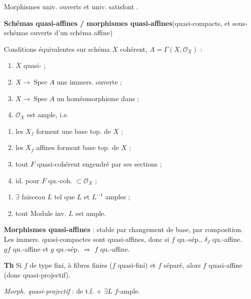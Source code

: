 \documentclass[11pt,a4paper]{article}
\begin{document}
Morphismes univ. ouverts et univ.  satisfont .

\textbf{Schémas quasi-affines / morphismes quasi-affines}\quad (quasi-compacts, et  sous-schémas ouverts d'un schéma affine)

Conditions équivalentes sur schéma $X$ cohérent, $A = \Gamma(X, \mathcal{O}_X)$ :

\begin{enumerate}
  \item[a)] $X$ quasi- ;
  \item[b)] $X \to \operatorname{Spec} A$ une immers. ouverte ;
  \item[b')] $X \to \operatorname{Spec} A$ un homéomorphisme dans ;
  \item[c)] $\mathcal{O}_X$ est ample, i.e.
\end{enumerate}

\begin{enumerate}
    \item[c')] les $X_f$ forment une base top. de $X$ ;
    \item[c'')] les $X_f$ affines forment base top. de $X$ ;
    \item[c''')] tout $F$ quasi-cohérent engendré par ses sections ;
    \item[c'''')] id. pour $F$ qu.-coh. $\subset \mathcal{O}_X$ ;
\end{enumerate}

\begin{enumerate}
  \item[d)] $\exists$ faisceau   $L$ tel que $L$ et $L^{-1}$ amples ;
  \item[d')] tout Module inv. $L$ est ample.
\end{enumerate}

\textbf{Morphismes quasi-affines} : stable par changement de base, par composition. Les immers. quasi-compactes sont quasi-affines, donc si $f$ qu.-sép., $\delta_f$ qu.-affine. $gf$ qu.-affine et $g$ qu.-sép. $\Rightarrow$ $f$ qu.-affine.

\textbf{Th} Si $f$ de type fini, \struck{\ill{}} à fibres finies ($f$ quasi-fini) et $f$ séparé, alors $f$ quasi-affine (donc quasi-projectif).

\emph{Morph. quasi-projectif} : de t.f. $+$ $\exists L$ $f$-ample.
\end{document}
